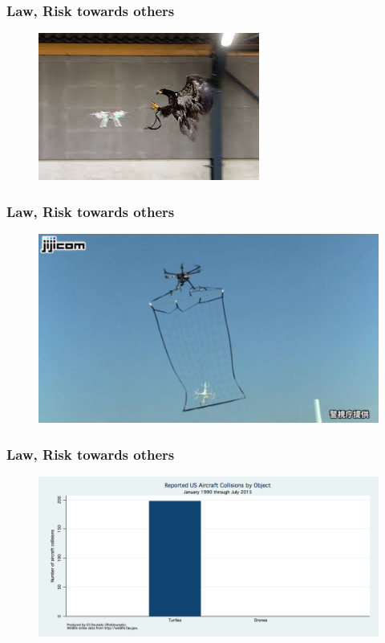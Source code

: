 \begin{frame}
\frametitle{Law, Risk towards others}
  
  \begin{figure}
  \includegraphics[scale=1.1]{pic/03_our-copter/eagle.jpeg}
  \end{figure}

\end{frame}



\begin{frame}
\frametitle{Law, Risk towards others}
  
  \begin{figure}
  \includegraphics[scale=0.32]{pic/03_our-copter/net.jpg}
  \end{figure}

\end{frame}



\begin{frame}
\frametitle{Law, Risk towards others}
  
  \begin{figure}
  \includegraphics[scale=0.32]{pic/03_our-copter/turtle.png}
  \end{figure}

\end{frame}
